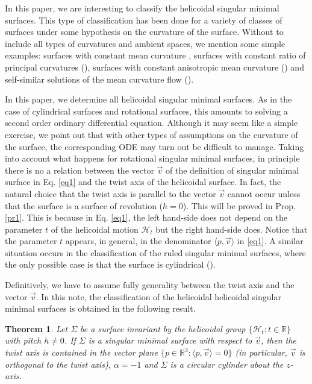 \documentclass[a4paper,12pt]{amsart}
\newtheorem{theorem}{Theorem}[section]
\theoremstyle{definition}
\def\r{\mathbb R}
\begin{document}
 In this paper, we are interesting to classify the helicoidal singular minimal surfaces. This type of classification has been done for a variety of classes of surfaces under some  hypothesis on the curvature of the surface. Without to include all types of curvatures and ambient spaces, we mention some simple examples:  surfaces with constant mean curvature \cite{cd,pe,ri}, surfaces with constant ratio of principal curvatures (\cite{li}),  surfaces with constant anisotropic mean curvature (\cite{kp}) and  self-similar solutions of the mean curvature flow (\cite{ha}).  
 
 
 In this paper, we   determine all helicoidal singular minimal surfaces. As in the case of cylindrical surfaces and rotational surfaces, this amounts to solving a second order ordinary differential equation. Although it may seem like a simple exercise, we point out that with other types of assumptions on the curvature of the surface, the corresponding ODE may turn out be difficult to manage. Taking   into account what happens for rotational singular minimal surfaces, in principle  there is no a relation between the vector $\vec{v}$ of the definition of singular minimal surface  in Eq. \eqref{eq1} and the  twist axis of the helicoidal surface. In fact, the  natural choice  that the twist axis is parallel to the vector $\vec{v}$ cannot occur unless that the surface is a surface of revolution ($h=0$). This will be proved in  Prop. \ref{pr1}. This is  because  in Eq. \eqref{eq1}, the left hand-side does not depend on  the parameter $t$ of the helicoidal motion $\mathcal{H}_t$ but  the right hand-side does. Notice that the parameter $t$ appears, in general, in the denominator $\langle p,\vec{v}\rangle$ in \eqref{eq1}. A similar situation occurs in the classification of the ruled singular minimal surfaces, where the only possible case is that the surface is cylindrical (\cite{ee}).

Definitively, we have to assume fully generality between the twist axis and the vector $\vec{v}$. In this note, the classification of the helicoidal helicoidal singular minimal surfaces is obtained in the following result.

 \begin{theorem} \label{t1}
Let $\Sigma$ be a   surface invariant by the helicoidal group $\{\mathcal{H}_t\colon t\in\r\}$ with pitch $h\not=0$.   If $\Sigma$ is a singular minimal surface with respect to $\vec{v}$, then  the twist axis is contained in the vector plane $\{p\in\r^3\colon\langle p,\vec{v}\rangle=0\}$ (in particular, $\vec{v}$ is orthogonal to the twist axis),   $\alpha=-1$  and $\Sigma$ is a circular cylinder about the $z$-axis.
\end{theorem}
  
\end{document}
